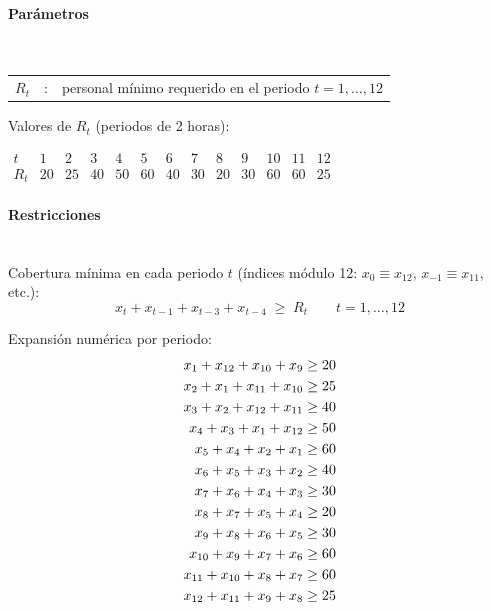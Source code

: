 \paragraph{Parámetros}\mbox{}\\
\begin{tabular}{l c l}
    $R_t$  & : & personal mínimo requerido en el periodo $t=1,\dots,12$\\
\end{tabular}

\noindent Valores de $R_t$ (periodos de 2 horas):\\[0.2cm]
\centerline{$
\begin{array}{c|cccccccccccc}
t      & 1 & 2 & 3 & 4 & 5 & 6 & 7 & 8 & 9 & 10 & 11 & 12 \\
\hline
R_t    & 20 & 25 & 40 & 50 & 60 & 40 & 30 & 20 & 30 & 60 & 60 & 25
\end{array}$}

\paragraph{Restricciones}\mbox{}\\
Cobertura mínima en cada periodo $t$ (índices módulo 12: $x_0\equiv x_{12}$, $x_{-1}\equiv x_{11}$, etc.):
\begin{equation}
    x_t + x_{t-1} + x_{t-3} + x_{t-4} \;\geq\; R_t \qquad t=1,\dots,12
\end{equation}

\noindent Expansión numérica por periodo:
\begin{align}
x_1  + x_{12} + x_{10} + x_{9}   &\ge 20 \notag \\
x_2  + x_{1}  + x_{11} + x_{10}  &\ge 25 \notag \\
x_3  + x_{2}  + x_{12} + x_{11}  &\ge 40 \notag \\
x_4  + x_{3}  + x_{1}  + x_{12}  &\ge 50 \notag \\
x_5  + x_{4}  + x_{2}  + x_{1}   &\ge 60 \notag \\
x_6  + x_{5}  + x_{3}  + x_{2}   &\ge 40 \notag \\
x_7  + x_{6}  + x_{4}  + x_{3}   &\ge 30 \notag \\
x_8  + x_{7}  + x_{5}  + x_{4}   &\ge 20 \notag \\
x_9  + x_{8}  + x_{6}  + x_{5}   &\ge 30 \notag \\
x_{10}+ x_{9}  + x_{7}  + x_{6}  &\ge 60 \notag \\
x_{11}+ x_{10} + x_{8}  + x_{7}  &\ge 60 \notag \\
x_{12}+ x_{11} + x_{9}  + x_{8}  &\ge 25 \notag
\end{align}

